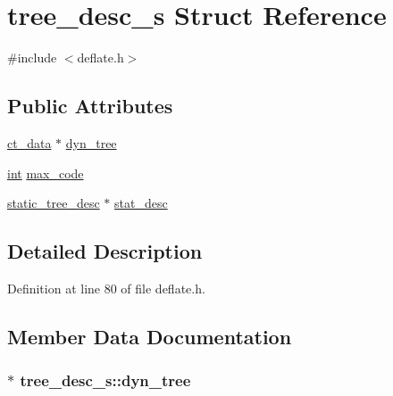 \hypertarget{structtree__desc__s}{\section{tree\-\_\-desc\-\_\-s Struct Reference}
\label{structtree__desc__s}
}


{\ttfamily \#include $<$deflate.\-h$>$}

\subsection*{Public Attributes}
\begin{DoxyCompactItemize}
\item 
\hyperlink{deflate_8h_a0a4b5df3b2254c627b8a59e038963118}{ct\-\_\-data} $\ast$ \hyperlink{structtree__desc__s_a5c79989c018b96c729e88e41f98a4920}{dyn\-\_\-tree}
\item 
\hyperlink{ioapi_8h_a787fa3cf048117ba7123753c1e74fcd6}{int} \hyperlink{structtree__desc__s_a11f42f2c0464693def462dcfdd871002}{max\-\_\-code}
\item 
\hyperlink{deflate_8h_a905910aabf6aabbe79ff0832e4a664cc}{static\-\_\-tree\-\_\-desc} $\ast$ \hyperlink{structtree__desc__s_a7f237428776ee85058bb7f7f11900dd2}{stat\-\_\-desc}
\end{DoxyCompactItemize}


\subsection{Detailed Description}


Definition at line 80 of file deflate.\-h.



\subsection{Member Data Documentation}
\hypertarget{structtree__desc__s_a5c79989c018b96c729e88e41f98a4920}{
\subsubsection[{dyn\-\_\-tree}]{$\ast$ tree\-\_\-desc\-\_\-s\-::dyn\-\_\-tree}}\label{structtree__desc__s_a5c79989c018b96c729e88e41f98a4920}


